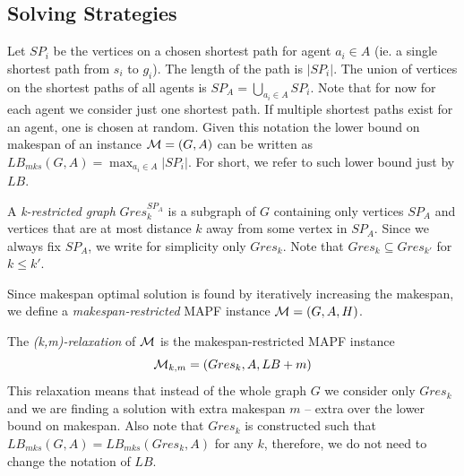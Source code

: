 \subsection{Solving Strategies}


Let $SP_i$ be the vertices on a chosen shortest path for agent $a_i \in A$ (ie. a single shortest path from $s_i$ to $g_i$). The length of the path is $|SP_i|$. The union of vertices on the shortest paths of all agents is $SP_A = \bigcup_{a_i \in A} SP_i$. Note that for now for each agent we consider just one shortest path. If multiple shortest paths exist for an agent, one is chosen at random. Given this notation the lower bound on makespan of an instance $\mathcal{M} = (G,A)$ can be written as $LB_{mks}(G,A) = \max_{a_i \in A} |SP_i|$. For short, we refer to such lower bound just by $LB$.


A \emph{k-restricted graph} $Gres_{k}^{SP_A}$ is a subgraph of $G$ containing only vertices $SP_A$ and vertices that are at most distance $k$ away from some vertex in $SP_A$. %
Since we always fix $SP_A$, we write for simplicity only $Gres_k$. Note that $Gres_k \subseteq Gres_{k'}$ for $k \leq k'$. %

Since makespan optimal solution is found by iteratively increasing the makespan, we define a \emph{makespan-restricted} MAPF instance $\mathcal{M} = (G,A,H)$. %

The \emph{(k,m)-relaxation} of $\mathcal{M}$ is the makespan-restricted MAPF instance
\[
  {\mathcal{M}}_{k,m} = (Gres_k,A,LB+m)
\]
This relaxation means that instead of the whole graph $G$ we consider only $Gres_k$ and we are finding a solution with extra makespan $m$ -- extra over the lower bound on makespan. Also note that $Gres_k$ is constructed such that $LB_{mks}(G,A) = LB_{mks}(Gres_k,A)$ for any $k$, therefore, we do not need to change the notation of $LB$.


